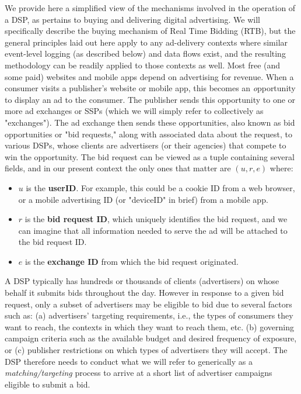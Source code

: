 \documentclass[11pt,a4paper]{article}
\theoremstyle{definition}
\theoremstyle{remark}
\theoremstyle{definition}
\theoremstyle{definition}
\theoremstyle{definition}
\theoremstyle{definition}
\theoremstyle{definition}
\theoremstyle{definition}
\begin{document}
We provide here a simplified view of the mechanisms involved in the operation of a DSP, as pertains to buying and delivering digital advertising. We will specifically describe the buying mechanism of Real Time Bidding (RTB), but the general principles laid out here apply to any ad-delivery contexts where similar event-level logging (as described below) and data flows exist, and the resulting methodology can be readily applied to those contexts as well. 
Most free (and some paid) websites and mobile apps depend on advertising for revenue. 
When a consumer visits a publisher's website or mobile app, this becomes an {\emph opportunity} to display an ad to the consumer. The publisher sends this opportunity to one or more ad exchanges or SSPs (which we will simply refer to collectively as "exchanges").
The ad exchange then sends these opportunities, also known as bid opportunities or "bid requests," along with associated data about the request, to various DSPs, whose clients are advertisers (or their agencies) that compete to win the opportunity. 
The bid request can be viewed as a tuple containing several fields, and in our present context the only ones that matter are $(u, r, e)$ where:
\begin{itemize}
	\item $u$ is the {\bf userID}. For example, this could be a cookie ID from a web browser, or a mobile advertising ID (or "deviceID" in brief) from a mobile app. 
	\item $r$ is the {\bf bid request ID}, which uniquely identifies the bid request, and we can imagine that all information needed to serve the ad will be attached to the bid request ID.
	\item $e$ is the {\bf exchange ID} from which the bid request originated.
\end{itemize}





A DSP typically has hundreds or thousands of clients (advertisers) on whose behalf it submits bids throughout the day. 
However in response to a given bid request, only a subset of advertisers may be eligible to bid due to several factors such as: (a) advertisers' targeting requirements, i.e., the types of consumers they want to reach, the contexts in which they want to reach them, etc. (b) governing campaign criteria such as the available budget and desired frequency of exposure, or (c) publisher restrictions on which types of advertisers they will accept. 
The DSP therefore needs to conduct what we will refer to generically as a {\em matching/targeting} process to arrive at a short list of advertiser campaigns eligible to submit a bid. 
\end{document}
